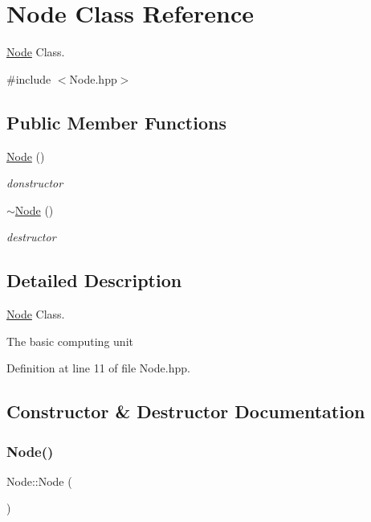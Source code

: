 \hypertarget{class_node}{}\section{Node Class Reference}
\label{class_node}


\hyperlink{class_node}{Node} Class.  




{\ttfamily \#include $<$Node.\+hpp$>$}

\subsection*{Public Member Functions}
\begin{DoxyCompactItemize}
\item 
\hyperlink{class_node_ad7a34779cad45d997bfd6d3d8043c75f}{Node} ()
\begin{DoxyCompactList}\small\item\em donstructor \end{DoxyCompactList}\item 
\hyperlink{class_node_aa0840c3cb5c7159be6d992adecd2097c}{$\sim$\+Node} ()
\begin{DoxyCompactList}\small\item\em destructor \end{DoxyCompactList}\end{DoxyCompactItemize}


\subsection{Detailed Description}
\hyperlink{class_node}{Node} Class. 

The basic computing unit 

Definition at line 11 of file Node.\+hpp.



\subsection{Constructor \& Destructor Documentation}
\mbox{\label{class_node_ad7a34779cad45d997bfd6d3d8043c75f}} 
\subsubsection{\texorpdfstring{Node()}{Node()}}
{\footnotesize\ttfamily Node\+::\+Node (\begin{DoxyParamCaption}{ }\end{DoxyParamCaption})}



